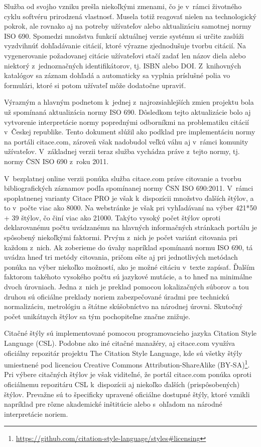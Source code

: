 \documentclass{fithesis3}
\begin{document}
	Služba od svojho vzniku prešla niekoľkými zmenami, čo je v~rámci životného cyklu softvéru prirodzená vlastnosť. Musela totiž reagovať nielen na technologický pokrok, ale rovnako aj na potreby užívateľov alebo aktualizáciu samotnej normy ISO 690. Spomedzi množstva funkcií aktuálnej verzie systému si určite zaslúži vyzdvihnúť dohľadávanie citácií, ktoré výrazne zjednodušuje tvorbu citácií. Na vygenerovanie požadovanej citácie užívateľovi stačí zadať len názov diela alebo niektorý z~jednoznačných identifikátorov, tj. ISBN alebo DOI. Z~knihovných katalógov sa záznam dohľadá a automaticky sa vyplnia príslušné polia vo formulári, ktoré si potom užívateľ môže dodatočne upraviť.

	Výrazným a hlavným podnetom k~jednej z~najrozsiahlejších zmien projektu bola už spomínaná aktualizácia normy ISO 690. Dôsledkom tejto aktualizácie bolo aj vytvorenie interpretácie normy poprednými odborníkmi na problematiku citácií v~Českej republike. Tento dokument slúžil ako podklad pre implementáciu normy na portáli citace.com, zároveň však nadobudol veľkú váhu aj v~rámci komunity užívateľov. V~základnej verzii teraz služba vychádza práve z~tejto normy, tj. normy ČSN ISO 690 z~roku 2011.
	
	V~bezplatnej online verzii ponúka služba citace.com práve citovanie a tvorbu bibliografických záznamov podľa spomínanej normy ČSN ISO 690:2011. V~rámci spoplatnenej varianty Citace PRO je však k~dispozícii množstvo ďalších štýlov, a to v~počte viac ako 8000. Na webstránke je však pri vyhľadávaní na výber 421*50 + 39 štýlov, čo činí viac ako 21000. Takýto vysoký počet štýlov oproti deklarovanému počtu uvádzanému na hlavných informačných stránkach portálu je spôsobený niekoľkými faktormi. Prvým z~nich je počet variánt citovania pri každom z~nich. Ak zoberieme do úvahy napríklad spomínanú normu ISO 690, tá uvádza hneď tri metódy citovania, pričom ešte aj pri jednotlivých metódach ponúka na výber niekoľko možností, ako je možné citáciu v~texte zapísať. Ďalším faktorom takéhoto vysokého počtu sú jazykové mutácie, a to hneď na minimálne dvoch úrovniach. Jedna z~nich je preklad pomocou lokalizačných súborov a tou druhou sú oficiálne preklady noriem zabezpečované úradmi pre technickú normalizáciu, metrológiu a štátne skúšobníctvo na národnej úrovni. Skutočný počet unikátnych štýlov sa tým pochopiteľne značne znižuje.
	
	Citačné štýly sú implementované pomocou programovacieho jazyka Citation Style Language (CSL). Podobne ako iné citačné manažéry, aj citace.com využíva oficiálny repozitár projektu The Citation Style Language, kde sú všetky štýly umiestnené pod licenciou Creative Commons Attribution-ShareAlike (BY-SA)\footnote{\url{https://github.com/citation-style-language/styles\#licensing}}. Pri výbere citačných štýlov je však viditeľné, že portál citace.com ponúka oproti oficiálnemu repozitáru CSL k~dispozícii aj niekoľko ďalších (prispôsobených) štýlov. Prevažne sú to špecificky upravené oficiálne dostupné štýly, ktoré vznikli napríklad pre rôzne akademické inštitúcie alebo s~ohľadom na národné interpretácie noriem.
	
\end{document}
